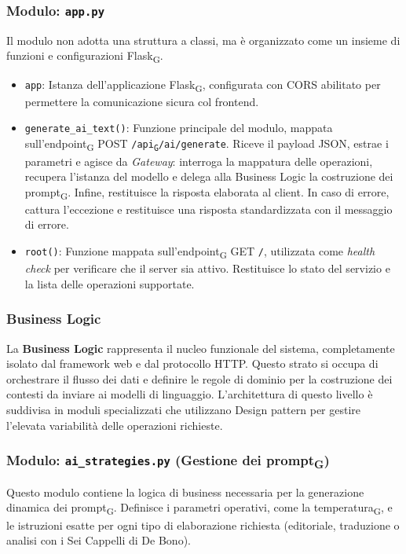 \documentclass[11pt,a4paper]{article}
\newcommand{\gls}[1]{#1\textsubscript{G}}
\begin{document}
\subsubsection{Modulo: \texttt{app.py}}
Il modulo non adotta una struttura a classi, ma è organizzato come un insieme di funzioni e configurazioni \gls{Flask}.
\begin{itemize}
    \item \texttt{app}: Istanza dell'applicazione \gls{Flask}, configurata con CORS abilitato per permettere la comunicazione sicura col frontend.
    \item \texttt{generate\_ai\_text()}: Funzione principale del modulo, mappata sull'\gls{endpoint} POST \texttt{/\gls{api}/ai/generate}. Riceve il payload JSON, estrae i parametri e agisce da \textit{Gateway}: interroga la mappatura delle operazioni, recupera l'istanza del modello e delega alla Business Logic la costruzione dei \gls{prompt}. Infine, restituisce la risposta elaborata al client. In caso di errore, cattura l'eccezione e restituisce una risposta standardizzata con il messaggio di errore.
    \item \texttt{root()}: Funzione mappata sull'\gls{endpoint} GET \texttt{/}, utilizzata come \textit{health check} per verificare che il server sia attivo. Restituisce lo stato del servizio e la lista delle operazioni supportate.
\end{itemize}


\subsubsection{Business Logic}
La \textbf{Business Logic} rappresenta il nucleo funzionale del sistema, completamente isolato dal framework web e dal protocollo HTTP. Questo strato si occupa di orchestrare il flusso dei dati e definire le regole di dominio per la costruzione dei contesti da inviare ai modelli di linguaggio. L'architettura di questo livello è suddivisa in moduli specializzati che utilizzano Design pattern per gestire l'elevata variabilità delle operazioni richieste.

\subsubsection{Modulo: \texttt{ai\_strategies.py} (Gestione dei \gls{prompt})}
Questo modulo contiene la logica di business necessaria per la generazione dinamica dei \gls{prompt}. Definisce i parametri operativi, come la \gls{temperatura}, e le istruzioni esatte per ogni tipo di elaborazione richiesta (editoriale, traduzione o analisi con i Sei Cappelli di De Bono). 
\end{document}
